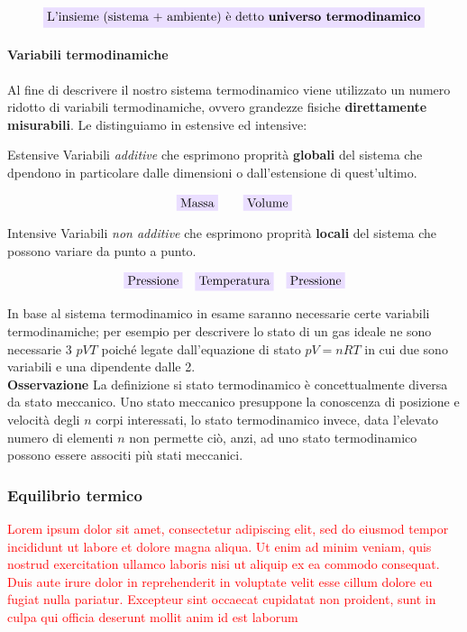 \documentclass[x11names]{article}
\newcommand{\viola}[1]{\colorbox{myred}{$\displaystyle #1$}}
\begin{document}
\[ 
\viola{\text{{L'insieme (sistema + ambiente) è detto \textbf{universo termodinamico}}}}
\]
\paragraph{Variabili termodinamiche}
Al fine di descrivere il nostro sistema termodinamico viene utilizzato un numero ridotto di variabili termodinamiche, ovvero grandezze fisiche \textbf{direttamente misurabili}. Le distinguiamo in estensive ed intensive:

\begin{center}
\begin{minipage}{0.49\textwidth}
	\begin{es}{Estensive}
		Variabili \textit{additive} che esprimono proprità \textbf{globali} del sistema che dpendono in particolare dalle dimensioni o dall'estensione di quest'ultimo.
		
		\[\viola{\text{Massa}} \qquad \viola{\text{Volume}}\]
		
	\end{es}
\end{minipage}
\begin{minipage}{0.49\textwidth}
	\begin{es}{Intensive}
	Variabili \textit{non additive} che esprimono proprità \textbf{locali} del sistema che possono variare da punto a punto.
	
	\[\viola{\text{Pressione}} \quad \viola{\text{Temperatura}}\quad \viola{\text{Pressione}}\]
	
	\end{es}
\end{minipage}
\end{center}
In base al sistema termodinamico in esame saranno necessarie certe variabili termodinamiche; per esempio per descrivere lo stato di un gas ideale ne sono necessarie 3 \(pVT\) poiché legate dall'equazione di stato \( pV = nRT\) in cui due sono variabili e una dipendente dalle 2.\\

\noindent
\textbf{Osservazione}  La definizione si stato termodinamico è concettualmente diversa da stato meccanico. Uno stato meccanico presuppone la conoscenza di posizione e velocità degli \(n\) corpi interessati, lo stato termodinamico invece, data l'elevato numero di elementi \(n\) non permette ciò, anzi, ad uno stato termodinamico possono essere associti più stati meccanici.

\subsubsection{Equilibrio termico}
\textcolor{red}{Lorem ipsum dolor sit amet, consectetur adipiscing elit, sed do eiusmod tempor incididunt ut labore et dolore magna aliqua. Ut enim ad minim veniam, quis nostrud exercitation ullamco laboris nisi ut aliquip ex ea commodo consequat. Duis aute irure dolor in reprehenderit in voluptate velit esse cillum dolore eu fugiat nulla pariatur. Excepteur sint occaecat cupidatat non proident, sunt in culpa qui officia deserunt mollit anim id est laborum}\\
\end{document}
